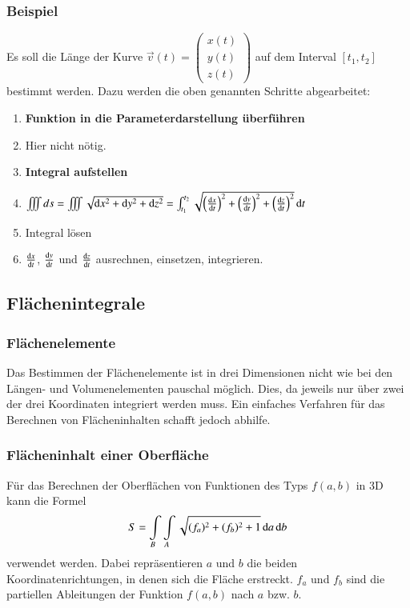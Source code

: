 \subsubsection{Beispiel}
Es soll die Länge der Kurve $\vec{v}(t) = \begin{pmatrix}x(t)\\y(t)\\z(t)\end{pmatrix}$ auf dem Interval $[t_1, t_2]$ bestimmt werden.
Dazu werden die oben genannten Schritte abgearbeitet:
\begin{enumerate}
    \item \textbf{Funktion in die Parameterdarstellung überführen}
    \item[] Hier nicht nötig. %
    \item \textbf{Integral aufstellen} 
    \item[] $ \iiint ds = \iiint \sqrt{\diff x^2 + \diff y^2 + \diff z^2} = \int_{t_1}^{t_2} \sqrt{\left(\frac{\diff x}{\diff t}\right)^2 + \left(\frac{\diff y}{\diff t}\right)^2 + \left(\frac{\diff z}{\diff t}\right)^2} \diff t$
    \item Integral lösen
    \item[] $\frac{\mathop{} \! \mathrm{d} x}{\mathop{} \! \mathrm{d} t}$, $\frac{\mathop{} \! \mathrm{d} y}{\mathop{} \! \mathrm{d} t}$ und $\frac{\mathop{} \! \mathrm{d} z}{\mathop{} \! \mathrm{d} t}$ ausrechnen, einsetzen, integrieren.
\end{enumerate}

\subsection{Flächenintegrale}
\subsubsection{Flächenelemente}
Das Bestimmen der Flächenelemente ist in drei Dimensionen nicht wie bei den Längen- und Volumenelementen pauschal möglich.
Dies, da jeweils nur über zwei der drei Koordinaten integriert werden muss.
Ein einfaches Verfahren für das Berechnen von Flächeninhalten schafft jedoch abhilfe.
\subsubsection{Flächeninhalt einer Oberfläche}
Für das Berechnen der Oberflächen von Funktionen des Typs $f(a, b)$ in 3D kann die Formel
$$ S = \int\limits_{B} \int\limits_{A} \sqrt{(f_{a})^2 + (f_{b})^2 + 1} \mathop{} \! \mathrm{d} a \mathop{} \! \mathrm{d} b $$
verwendet werden. Dabei repräsentieren $a$ und $b$ die beiden Koordinatenrichtungen, in denen sich die Fläche erstreckt.
$f_a$ und $f_b$ sind die partiellen Ableitungen der Funktion $f(a, b)$ nach $a$ bzw. $b$.
\medskip

